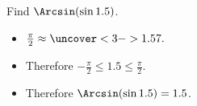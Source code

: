 \begin{frame}
\begin{example}
Find $\Arcsin (\sin 1.5)$.  
\begin{itemize}
\item<2->  \alert<2-3>{$\frac{\pi}{2} \approx \uncover<3->{1.57.}$}
\item<4->  Therefore $-\frac{\pi}{2} \leq 1.5\leq \frac{\pi}{2}$.  
\item<5->  Therefore $\Arcsin (\sin 1.5) = 1.5$.  
\end{itemize}
\end{example}
\end{frame}
